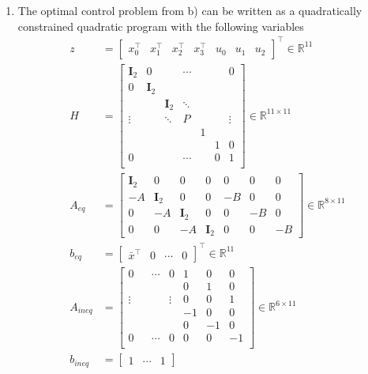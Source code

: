 \documentclass[12pt,pdftex,a4paper]{scrartcl}
\newcommand{\set}[1]{\mathbb{#1}}
\newcommand{\mat}[1]{\textbf{#1}}
\begin{document}
\begin{enumerate}
   \item The optimal control problem from b) can be written as a quadratically constrained quadratic program with the following variables
   \begin{align*}
		z &=
		\begin{bmatrix}
			x_0^\top & x_1^\top & x_2^\top & x_3^\top & u_0 &  u_1 & u_2 
		\end{bmatrix}^\top
		\in \set{R}^{11} \\
		H &=
		\begin{bmatrix}
			\mat{I}_{2} & 0 & & \cdots&  & & 0 \\
			0 & \mat{I}_{2} & & & & & \\
			&  & \mat{I}_{2} & \ddots & & & \\
			\vdots & & \ddots & P & & & \vdots \\
			& & & & 1 & & \\
			& & & &  & 1 & 0 \\
			0 & & & \cdots & & 0 & 1 \\
		\end{bmatrix}
		\in \set{R}^{11 \times 11} \\
		A_{eq} &= 
		\begin{bmatrix}
			\mat{I}_2 & 0 & 0 & 0 & 0 & 0 & 0 \\
			-A & \mat{I}_2 & 0 & 0 & -B & 0 & 0 \\
			0 & -A & \mat{I}_2 & 0 & 0 & -B & 0\\
			0 & 0 & -A & \mat{I}_2 & 0 & 0 & -B
		\end{bmatrix}
		\in \set{R}^{8 \times 11} \\	
		b_{eq} &= 
		\begin{bmatrix}
			\bar{x}^\top & 0 & \cdots & 0
		\end{bmatrix}^\top
		\in \set{R}^{11} \\
		A_{ineq} &=
		\begin{bmatrix}
			0 & & \cdots & 0 & 1 & 0 & 0 \\
			& & & & 0 & 1 & 0 \\
			\vdots & & & \vdots & 0 & 0 & 1 \\
			& & & & -1 & 0 & 0 \\
			& & & & 0 & -1 & 0 \\
			0 & & \cdots & 0 & 0 & 0 & -1 \\
		\end{bmatrix}
		\in \set{R}^{6 \times 11} \\
		b_{ineq} &=
		\begin{bmatrix}
			1 & \cdots & 1

\end{bmatrix}
\end{align*}
\end{enumerate}
\end{document}
